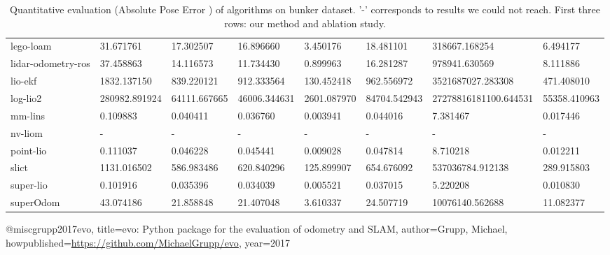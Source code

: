 \begin{table}[]
{\begin{tabular}{llllllll}
		lego-loam & 31.671761 & 17.302507 & 16.896660 & 3.450176 & 18.481101 & 318667.168254 & 6.494177 \\
		lidar-odometry-ros & 37.458863 & 14.116573 & 11.734430 & 0.899963 & 16.281287 & 978941.630569 & 8.111886 \\
		lio-ekf & 1832.137150 & 839.220121 & 912.333564 & 130.452418 & 962.556972 & 3521687027.283308 & 471.408010 \\
		log-lio2 & 280982.891924 & 64111.667665 & 46006.344631 & 2601.087970 & 84704.542943 & 27278816181100.644531 & 55358.410963 \\
		mm-lins & 0.109883 & 0.040411 & 0.036760 & 0.003941 & 0.044016 & 7.381467 & 0.017446 \\
		nv-liom & - & - & - & - & - & - & - \\
		point-lio & 0.111037 & 0.046228 & 0.045441 & 0.009028 & 0.047814 & 8.710218 & 0.012211 \\
		slict & 1131.016502 & 586.983486 & 620.840296 & 125.899907 & 654.676092 & 537036784.912138 & 289.915803 \\
		super-lio & 0.101916 & 0.035396 & 0.034039 & 0.005521 & 0.037015 & 5.220208 & 0.010830 \\
		superOdom & 43.074186 & 21.858848 & 21.407048 & 3.610337 & 24.507719 & 10076140.562688 & 11.082377 \\
        	\end{tabular}%
        }
        	\caption{Quantitative evaluation (Absolute Pose Error \cite{grupp2017evo}) of algorithms on bunker dataset. '-' corresponds to results we could not reach. First three rows: our method and ablation study.}
        	\label{table3}
\end{table}

@misc{grupp2017evo,
  title={evo: Python package for the evaluation of odometry and SLAM},
  author={Grupp, Michael},
  howpublished={\url{https://github.com/MichaelGrupp/evo}},
  year={2017}
}
